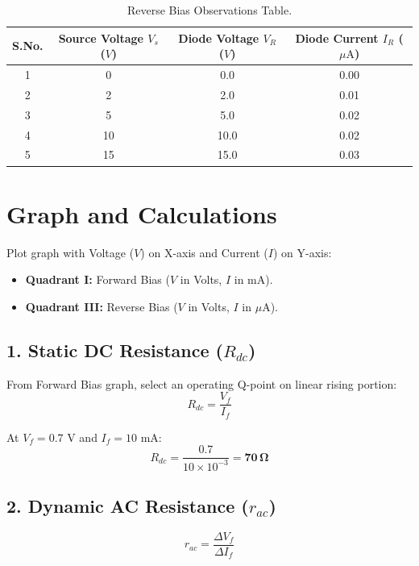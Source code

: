 \begin{table}[htbp]
\centering
\small
\begin{tabularx}{0.85\textwidth}{c c c c}
\toprule
\textbf{S.No.} & \textbf{Source Voltage $V_s$ ($V$)} & \textbf{Diode Voltage $V_R$ ($V$)} & \textbf{Diode Current $I_R$ ($\mu\text{A}$)} \\
\midrule
1 & 0 & 0.0 & 0.00 \\
2 & 2 & 2.0 & 0.01 \\
3 & 5 & 5.0 & 0.02 \\
4 & 10 & 10.0 & 0.02 \\
5 & 15 & 15.0 & 0.03 \\
\bottomrule
\end{tabularx}
\caption{Reverse Bias Observations Table.}
\label{tab:rb-readings}
\end{table}

\section{Graph and Calculations}

Plot graph with Voltage ($V$) on X-axis and Current ($I$) on Y-axis:
\begin{itemize}
    \item \textbf{Quadrant I:} Forward Bias ($V$ in Volts, $I$ in $\text{mA}$).
    \item \textbf{Quadrant III:} Reverse Bias ($V$ in Volts, $I$ in $\mu\text{A}$).
\end{itemize}

\subsection{1. Static DC Resistance ($R_{dc}$)}
From Forward Bias graph, select an operating Q-point on linear rising portion:
\begin{equation}
    R_{dc} = \frac{V_f}{I_f}
\end{equation}

\begin{example}
At $V_f = 0.7\text{ V}$ and $I_f = 10\text{ mA}$:
\begin{equation*}
    R_{dc} = \frac{0.7}{10 \times 10^{-3}} = \mathbf{70\,\Omega}
\end{equation*}
\end{example}

\subsection{2. Dynamic AC Resistance ($r_{ac}$)}
\begin{equation}
    r_{ac} = \frac{\Delta V_f}{\Delta I_f}
\end{equation}

